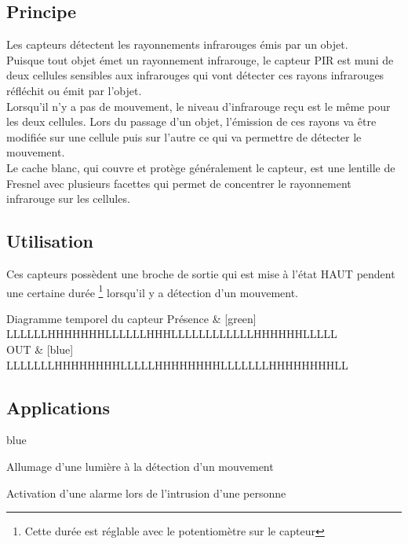\subsection{Principe}

Les capteurs  détectent les rayonnements infrarouges émis par un objet.\\
Puisque tout objet émet un rayonnement infrarouge, le capteur PIR est muni de deux cellules sensibles aux infrarouges qui vont détecter ces rayons infrarouges réfléchit ou émit par l'objet. \\

Lorsqu’il n’y a pas de mouvement, le niveau d’infrarouge reçu est le même pour les deux cellules. Lors du passage d’un objet, l’émission de ces rayons va être modifiée sur une cellule puis sur l’autre ce qui va permettre de détecter le mouvement. \\

Le cache blanc, qui couvre et protège généralement le capteur, est une lentille de Fresnel avec plusieurs facettes qui permet de concentrer le rayonnement infrarouge sur les cellules.

\subsection{Utilisation}

Ces capteurs possèdent une broche de sortie qui est mise à l'état HAUT pendent une certaine durée
\footnote{Cette durée est réglable avec le potentiomètre sur le capteur} lorsqu'il y a détection d'un mouvement.\\


\begin{numeric}{Diagramme temporel du capteur}
    Présence & [green] LLLLLLHHHHHHHLLLLLLHHHLLLLLLLLLLLLHHHHHHLLLLL \\
    OUT & [blue] LLLLLLLHHHHHHHHLLLLLHHHHHHHHLLLLLLLHHHHHHHHLL \\
\end{numeric}


\subsection{Applications}

\begin{items}{blue}{\Triangle}
    \item Allumage d’une lumière à la détection d’un mouvement
    \item Activation d’une alarme lors de l’intrusion d’une personne
\end{items}


